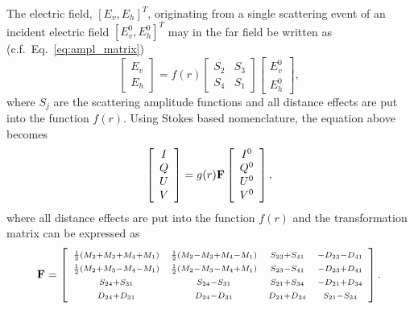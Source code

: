 




\label{sec:polarization:ampmatrix}
The electric field, $[E_v,E_h]^T$, originating from a single
scattering event of an incident electric field $[E_v^0,E_h^0]^T$ may
in the far field be written as (c.f.\ Eq.~\ref{eq:ampl_matrix})
\begin{equation}
  \label{eq:polarisation:ampmatrix1}
   \left[ \begin{array}{c} E_v \\ E_h \end{array} \right] =
   f(r)
   \left[ \begin{array}{cc} S_2 & S_3 \\ S_4 & S_1 \end{array} \right]
   \left[ \begin{array}{c} E_v^0 \\ E_h^0 \end{array} \right], 
\end{equation}
where $S_j$ are the scattering amplitude functions and all distance
effects are put into the function $f(r)$. Using Stokes based
nomenclature, the equation above becomes
\begin{equation}
  \label{eq:polarisation:ampmatrix2}
   \left[ \begin{array}{c} I\\Q\\U\\V \end{array} \right] =
   g(r)\mathbf{F}
   \left[ \begin{array}{c} I^0\\Q^0\\U^0\\V^0 \end{array} \right],
\end{equation}
where all distance effects are put into the function $f(r)$ and the
transformation matrix  can be expressed as
\begin{equation}
  \label{eq:polarisation:Fmatrix}
  \mathbf{F} = \left[ \begin{array}{cccc} 
    \scriptstyle \frac{1}{2}(M_2+M_3+M_4+M_1) & 
    \scriptstyle \frac{1}{2}(M_2-M_3+M_4-M_1) & 
    \scriptstyle S_{23}+S_{41} & \scriptstyle -D_{23}-D_{41} \\
    \scriptstyle \frac{1}{2}(M_2+M_3-M_4-M_1) & 
    \scriptstyle \frac{1}{2}(M_2-M_3-M_4+M_1) & 
    \scriptstyle S_{23}-S_{41} & \scriptstyle -D_{23}+D_{41} \\
    \scriptstyle S_{24}+S_{31} & \scriptstyle S_{24}-S_{31} & 
    \scriptstyle S_{21}+S_{34} & \scriptstyle -D_{21}+D_{34} \\
    \scriptstyle D_{24}+D_{31} & \scriptstyle D_{24}-D_{31} & 
    \scriptstyle D_{21}+D_{34} & \scriptstyle S_{21}-S_{34} 
  \end{array} \right].
\end{equation}
